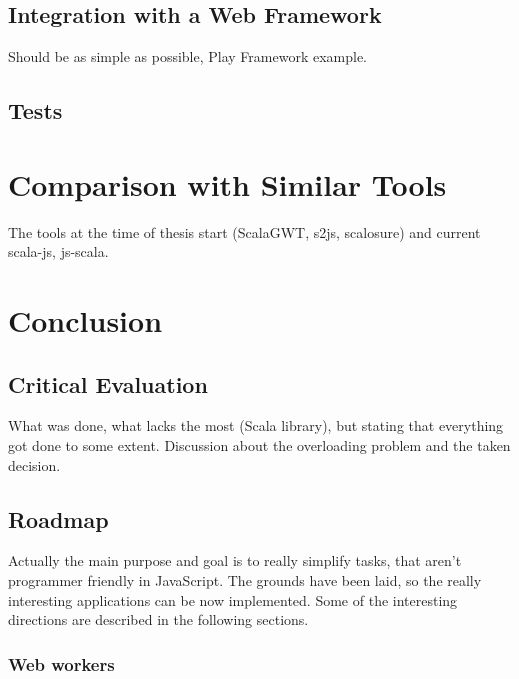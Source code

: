 \documentclass[12pt,a4paper]{report}
\begin{document}
\section{Integration with a Web Framework}

Should be as simple as possible, Play Framework example.

\section{Tests}



\chapter{Comparison with Similar Tools}

The tools at the time of thesis start (ScalaGWT, s2js, scalosure) and current scala-js, js-scala.



\chapter{Conclusion}

\section{Critical Evaluation}

What was done, what lacks the most (Scala library), but stating that everything got done to some extent. Discussion about the overloading problem and the taken decision.

\section{Roadmap}

Actually the main purpose and goal is to really simplify tasks, that aren't programmer friendly in JavaScript. The grounds have been laid, so the really interesting applications can be now implemented. Some of the interesting directions are described in the following sections.

\subsection{Web workers}
\end{document}
